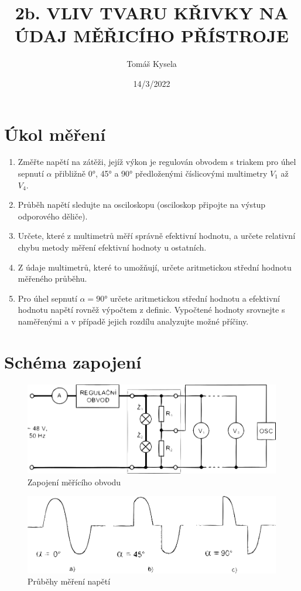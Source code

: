 \documentclass{article}
\title{\textbf{2b. VLIV TVARU KŘIVKY NA ÚDAJ MĚŘICÍHO PŘÍSTROJE}}
\author{Tomáš Kysela}
\date{14/3/2022}
\begin{document}
\maketitle

\section{Úkol měření}
\begin{enumerate}
	\item Změřte napětí na zátěži, jejíž výkon je regulován obvodem s triakem pro úhel sepnutí $\alpha$ přibližně 0\si{\degree}, 45\si{\degree} a 90\si{\degree} předloženými číslicovými multimetry $V_1$ až $V_4$.
	\item Průběh napětí sledujte na osciloskopu (osciloskop připojte na výstup odporového děliče).
	\item Určete, které z multimetrů měří správně efektivní hodnotu, a určete relativní chybu metody měření efektivní hodnoty u ostatních.
	\item Z údaje multimetrů, které to umožňují, určete aritmetickou střední hodnotu měřeného průběhu.
	\item Pro úhel sepnutí $\alpha = 90\si{\degree}$ určete aritmetickou střední hodnotu a efektivní hodnotu napětí rovněž výpočtem z definic. Vypočtené hodnoty srovnejte s naměřenými a v případě jejich rozdílu analyzujte možné příčiny.
\end{enumerate}
\section{Schéma zapojení}
\begin{figure}[h]
	\centering
	\includegraphics[width=0.7\linewidth]{scheme1}
	\caption{Zapojení měřícího obvodu}
	\label{fig:scheme1}
\end{figure}
\begin{figure}[H]
	\centering
	\includegraphics[width=0.6\linewidth]{scheme2}
	\caption{Průběhy měření napětí}
	\label{fig:scheme2}
\end{figure}
\end{document}
